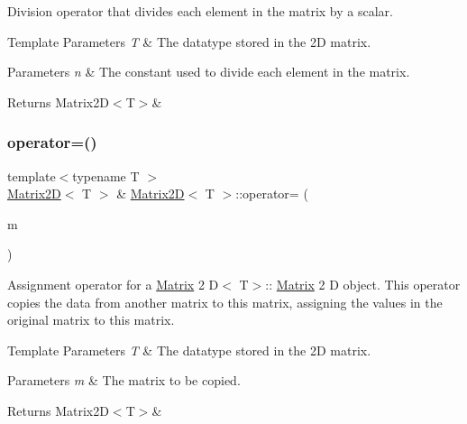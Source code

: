 Division operator that divides each element in the matrix by a scalar. 


\begin{DoxyTemplParams}{Template Parameters}
{\em T} & The datatype stored in the 2D matrix. \\
\hline
\end{DoxyTemplParams}

\begin{DoxyParams}{Parameters}
{\em n} & The constant used to divide each element in the matrix. \\
\hline
\end{DoxyParams}
\begin{DoxyReturn}{Returns}
Matrix2\+D$<$\+T$>$\& 
\end{DoxyReturn}
\mbox{\label{classMatrix2D_a17597829237784fa6089a23b7accb631}} 
\subsubsection{\texorpdfstring{operator=()}{operator=()}}
{\footnotesize\ttfamily template$<$typename T $>$ \\
\mbox{\hyperlink{classMatrix2D}{Matrix2D}}$<$ T $>$ \& \mbox{\hyperlink{classMatrix2D}{Matrix2D}}$<$ T $>$\+::operator= (\begin{DoxyParamCaption}\item[{const \mbox{\hyperlink{classMatrix2D}{Matrix2D}}$<$ T $>$ \&}]{m }\end{DoxyParamCaption})}



Assignment operator for a \mbox{\hyperlink{classMatrix}{Matrix}} 2 D$<$ T$>$\+:\+: \mbox{\hyperlink{classMatrix}{Matrix}} 2 D object. This operator copies the data from another matrix to this matrix, assigning the values in the original matrix to this matrix. 


\begin{DoxyTemplParams}{Template Parameters}
{\em T} & The datatype stored in the 2D matrix. \\
\hline
\end{DoxyTemplParams}

\begin{DoxyParams}{Parameters}
{\em m} & The matrix to be copied. \\
\hline
\end{DoxyParams}
\begin{DoxyReturn}{Returns}
Matrix2\+D$<$\+T$>$\& 
\end{DoxyReturn}
\mbox{\label{classMatrix2D_a27ccf42f23c568b2397b744ec32a41d1}} 
